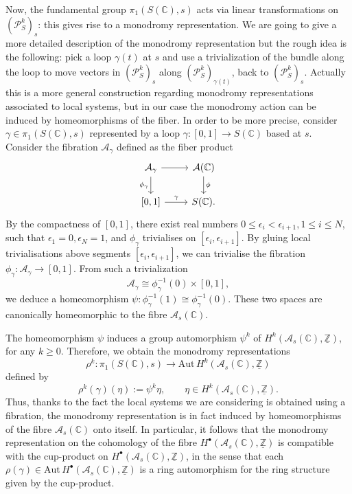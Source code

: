 \documentclass[10 pt,a4paper]{article}
\theoremstyle{plain}
\theoremstyle{definition}
\theoremstyle{named}
\newcommand{\cA}{\mathcal A}
\newcommand{\bC}{\mathbb C}
\newcommand{\cP}{\mathcal P}
\newcommand{\bZ}{\mathbb Z}
\begin{document}
Now, the fundamental group $\pi_1(S(\bC),s)$ acts via linear transformations on $(\cP_S^k)_s$: this gives rise to a monodromy representation. We are going to give a more detailed description of the monodromy representation but the rough idea is the following: pick a loop $\gamma(t)$ at $s$ and use a trivialization of the bundle along the loop to move vectors in $(\cP_S^k)_s$ along $(\cP^k_S)_{\gamma(t)}$, back to $(\cP_S^k)_s$. Actually this is a more general construction regarding monodromy representations associated to local systems, but in our case the monodromy action can be induced by homeomorphisms of the fiber. In order to be more precise, consider $\gamma \in \pi_1(S(\bC),s)$ represented by a loop $\gamma:[0,1] \to S(\bC)$ based at $s$. Consider the fibration $\cA_\gamma$ defined as the fiber product
$$\begin{tikzcd}
    \cA_\gamma \arrow{d}[swap]{\phi_\gamma} \arrow{r} & \cA(\bC) \arrow{d}{\phi}\\
    \left[0,1\right] \arrow{r}{\gamma} & S(\bC).
\end{tikzcd}$$
By the compactness of $[0,1]$, there exist real numbers $0\le \epsilon_i < \epsilon_{i+1}, 1\le i \le N$, such that $\epsilon_1 =0,\epsilon_N=1$, and $\phi_\gamma$ trivialises on $[\epsilon_i,\epsilon_{i+1}]$. By gluing local trivialisations above segments $[\epsilon_i,\epsilon_{i+1}]$, we can trivialise the fibration $\phi_\gamma: \cA_\gamma \to [0,1]$. From such a trivialization
\[
\cA_\gamma \cong \phi_\gamma^{-1}(0) \times [0,1],
\]
we deduce a homeomorphism $\psi: \phi_\gamma^{-1}(1) \cong \phi_\gamma^{-1}(0)$. These two spaces are canonically homeomorphic to the fibre $\cA_s(\bC)$.

The homeomorphism $\psi$ induces a group automorphism $\psi^k$ of $H^k(\cA_s(\bC),\underline{\bZ})$, for any $k\ge 0$. Therefore, we obtain the monodromy representations
\begin{equation}\label{eq:mon_repr}
\rho^k: \pi_1(S(\bC),s) \to \textrm{Aut}\, H^k(\cA_s(\bC),\underline{\bZ})
\end{equation}
defined by
\[
\rho^k(\gamma)(\eta) := \psi^k\eta, \qquad \eta \in H^k(\cA_s(\bC),\underline{\bZ}). 
\]
Thus, thanks to the fact the local systems we are considering is obtained using a fibration, the monodromy representation is in fact induced by homeomorphisms of the fibre $\cA_s(\bC)$ onto itself. In particular, it follows that the monodromy representation on the cohomology of the fibre $H^\bullet(\cA_s(\bC),\underline{\bZ})$ is compatible with the cup-product on $H^\bullet(\cA_s(\bC),\underline{\bZ})$, in the sense that each $\rho(\gamma) \in \textrm{Aut}\,H^\bullet(\cA_s(\bC),\underline{\bZ})$ is a ring automorphism for the ring structure given by the cup-product. %
\end{document}
